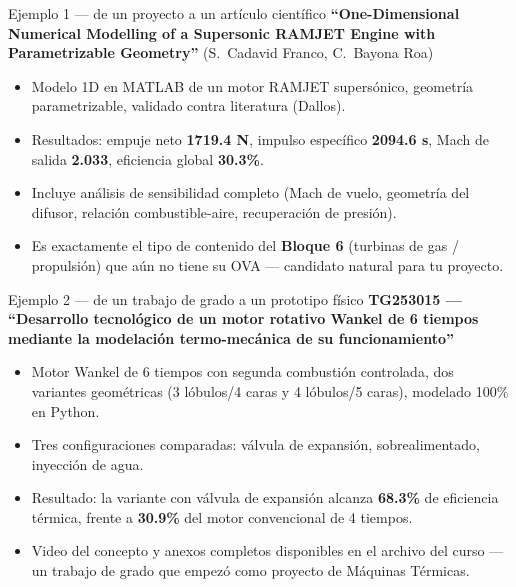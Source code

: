 \documentclass[aspectratio=169]{beamer}
\begin{document}
\begin{frame}{Ejemplo 1 — de un proyecto a un artículo científico}
  \textbf{``One-Dimensional Numerical Modelling of a Supersonic RAMJET Engine with Parametrizable Geometry''}
  \small (S.\ Cadavid Franco, C.\ Bayona Roa)
  \begin{itemize}
    \item Modelo 1D en MATLAB de un motor RAMJET supersónico, geometría parametrizable, validado contra
      literatura (Dallos).
    \item Resultados: empuje neto \textbf{1719.4 N}, impulso específico \textbf{2094.6 s}, Mach de salida
      \textbf{2.033}, eficiencia global \textbf{30.3\%}.
    \item Incluye análisis de sensibilidad completo (Mach de vuelo, geometría del difusor, relación
      combustible-aire, recuperación de presión).
    \item Es exactamente el tipo de contenido del \textbf{Bloque 6} (turbinas de gas / propulsión) que aún
      no tiene su OVA — candidato natural para tu proyecto.
  \end{itemize}
\end{frame}

\begin{frame}{Ejemplo 2 — de un trabajo de grado a un prototipo físico}
  \textbf{TG253015 — ``Desarrollo tecnológico de un motor rotativo Wankel de 6 tiempos mediante la
  modelación termo-mecánica de su funcionamiento''}
  \begin{itemize}
    \item Motor Wankel de 6 tiempos con segunda combustión controlada, dos variantes geométricas
      (3 lóbulos/4 caras y 4 lóbulos/5 caras), modelado 100\% en Python.
    \item Tres configuraciones comparadas: válvula de expansión, sobrealimentado, inyección de agua.
    \item Resultado: la variante con válvula de expansión alcanza \textbf{68.3\%} de eficiencia térmica,
      frente a \textbf{30.9\%} del motor convencional de 4 tiempos.
    \item Video del concepto y anexos completos disponibles en el archivo del curso — un trabajo de grado
      que empezó como proyecto de Máquinas Térmicas.
  \end{itemize}
\end{frame}
\end{document}
